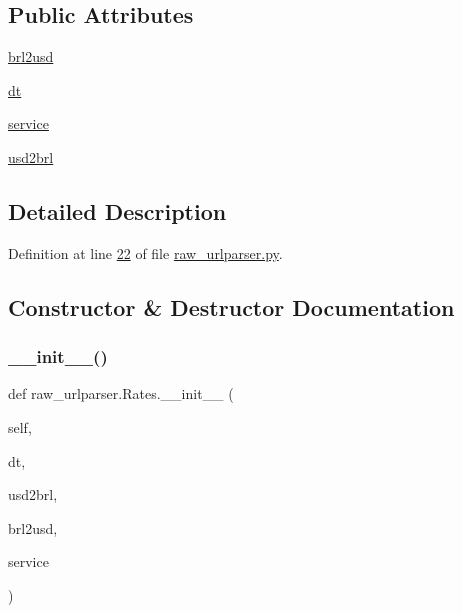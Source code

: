 \subsection*{Public Attributes}
\begin{DoxyCompactItemize}
\item 
\hyperlink{classraw__urlparser_1_1_rates_adc9df007bec75344f9f89cb631d1aeb3}{brl2usd}
\item 
\hyperlink{classraw__urlparser_1_1_rates_a09b3c7cb595f3135c3eda648b1bb4c3f}{dt}
\item 
\hyperlink{classraw__urlparser_1_1_rates_acb05316e95a39bc42590a882712f854b}{service}
\item 
\hyperlink{classraw__urlparser_1_1_rates_a52d9b688be8385a87783b27839749b4a}{usd2brl}
\end{DoxyCompactItemize}


\subsection{Detailed Description}


Definition at line \hyperlink{raw__urlparser_8py_source_l00022}{22} of file \hyperlink{raw__urlparser_8py_source}{raw\+\_\+urlparser.\+py}.



\subsection{Constructor \& Destructor Documentation}
\mbox{\label{classraw__urlparser_1_1_rates_a7d9b61bce159f7e52bdf8a1ebfada45d}} 
\subsubsection{\texorpdfstring{\+\_\+\+\_\+init\+\_\+\+\_\+()}{\_\_init\_\_()}}
{\footnotesize\ttfamily def raw\+\_\+urlparser.\+Rates.\+\_\+\+\_\+init\+\_\+\+\_\+ (\begin{DoxyParamCaption}\item[{}]{self,  }\item[{}]{dt,  }\item[{}]{usd2brl,  }\item[{}]{brl2usd,  }\item[{}]{service }\end{DoxyParamCaption})}



